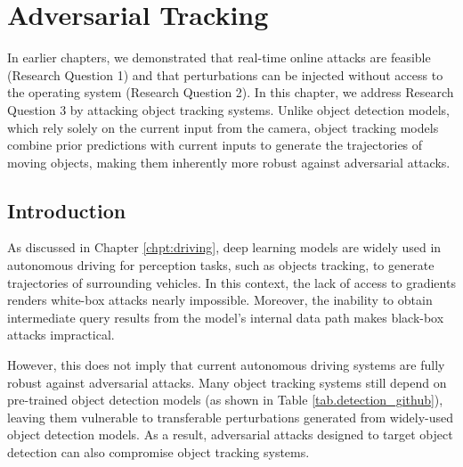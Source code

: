 \chapter{Adversarial Tracking}
\label{chpt:tracking}


In earlier chapters, we demonstrated that real-time online attacks are feasible (Research Question 1) and that perturbations can be injected without access to the operating system (Research Question 2). In this chapter, we address Research Question 3 by attacking object tracking systems. Unlike object detection models, which rely solely on the current input from the camera, object tracking models combine prior predictions with current inputs to generate the trajectories of moving objects, making them inherently more robust against adversarial attacks.

\section{Introduction}
\label{sec:adv_track}

As discussed in Chapter \ref{chpt:driving}, deep learning models are widely used in autonomous driving for perception tasks, such as  objects tracking, to generate trajectories of surrounding vehicles. In this context, the lack of access to gradients renders white-box attacks nearly impossible. Moreover, the inability to obtain intermediate query results from the model's internal data path makes black-box attacks impractical.

However, this does not imply that current autonomous driving systems are fully robust against adversarial attacks. Many object tracking systems still depend on pre-trained object detection models (as shown in Table \ref{tab.detection_github}), leaving them vulnerable to transferable perturbations generated from widely-used object detection models. As a result, adversarial attacks designed to target object detection can also compromise object tracking systems.



